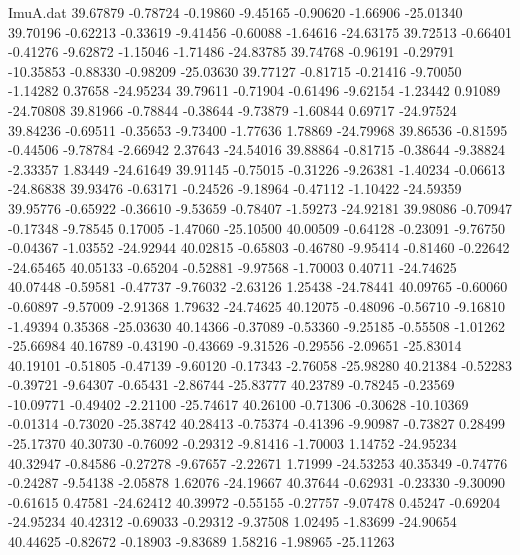 \begin{filecontents}{ImuA.dat}
  39.67879   -0.78724   -0.19860   -9.45165   -0.90620   -1.66906  -25.01340
  39.70196   -0.62213   -0.33619   -9.41456   -0.60088   -1.64616  -24.63175
  39.72513   -0.66401   -0.41276   -9.62872   -1.15046   -1.71486  -24.83785
  39.74768   -0.96191   -0.29791  -10.35853   -0.88330   -0.98209  -25.03630
  39.77127   -0.81715   -0.21416   -9.70050   -1.14282    0.37658  -24.95234
  39.79611   -0.71904   -0.61496   -9.62154   -1.23442    0.91089  -24.70808
  39.81966   -0.78844   -0.38644   -9.73879   -1.60844    0.69717  -24.97524
  39.84236   -0.69511   -0.35653   -9.73400   -1.77636    1.78869  -24.79968
  39.86536   -0.81595   -0.44506   -9.78784   -2.66942    2.37643  -24.54016
  39.88864   -0.81715   -0.38644   -9.38824   -2.33357    1.83449  -24.61649
  39.91145   -0.75015   -0.31226   -9.26381   -1.40234   -0.06613  -24.86838
  39.93476   -0.63171   -0.24526   -9.18964   -0.47112   -1.10422  -24.59359
  39.95776   -0.65922   -0.36610   -9.53659   -0.78407   -1.59273  -24.92181
  39.98086   -0.70947   -0.17348   -9.78545    0.17005   -1.47060  -25.10500
  40.00509   -0.64128   -0.23091   -9.76750   -0.04367   -1.03552  -24.92944
  40.02815   -0.65803   -0.46780   -9.95414   -0.81460   -0.22642  -24.65465
  40.05133   -0.65204   -0.52881   -9.97568   -1.70003    0.40711  -24.74625
  40.07448   -0.59581   -0.47737   -9.76032   -2.63126    1.25438  -24.78441
  40.09765   -0.60060   -0.60897   -9.57009   -2.91368    1.79632  -24.74625
  40.12075   -0.48096   -0.56710   -9.16810   -1.49394    0.35368  -25.03630
  40.14366   -0.37089   -0.53360   -9.25185   -0.55508   -1.01262  -25.66984
  40.16789   -0.43190   -0.43669   -9.31526   -0.29556   -2.09651  -25.83014
  40.19101   -0.51805   -0.47139   -9.60120   -0.17343   -2.76058  -25.98280
  40.21384   -0.52283   -0.39721   -9.64307   -0.65431   -2.86744  -25.83777
  40.23789   -0.78245   -0.23569  -10.09771   -0.49402   -2.21100  -25.74617
  40.26100   -0.71306   -0.30628  -10.10369   -0.01314   -0.73020  -25.38742
  40.28413   -0.75374   -0.41396   -9.90987   -0.73827    0.28499  -25.17370
  40.30730   -0.76092   -0.29312   -9.81416   -1.70003    1.14752  -24.95234
  40.32947   -0.84586   -0.27278   -9.67657   -2.22671    1.71999  -24.53253
  40.35349   -0.74776   -0.24287   -9.54138   -2.05878    1.62076  -24.19667
  40.37644   -0.62931   -0.23330   -9.30090   -0.61615    0.47581  -24.62412
  40.39972   -0.55155   -0.27757   -9.07478    0.45247   -0.69204  -24.95234
  40.42312   -0.69033   -0.29312   -9.37508    1.02495   -1.83699  -24.90654
  40.44625   -0.82672   -0.18903   -9.83689    1.58216   -1.98965  -25.11263

\end{filecontents}
